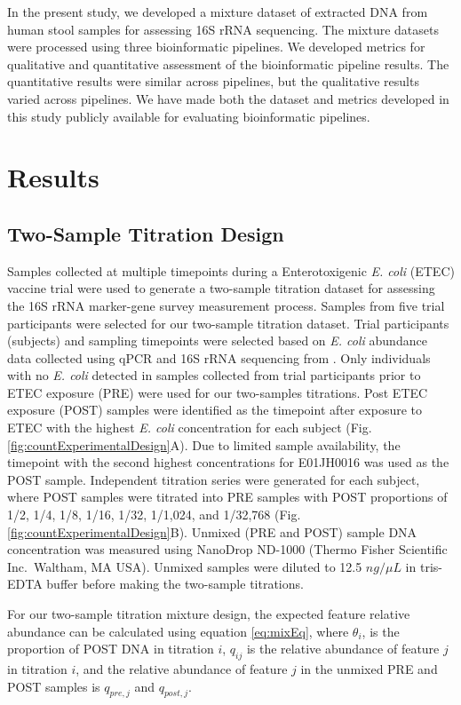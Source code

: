 \documentclass{bmcart}
\begin{document}
In the present study, we developed a mixture dataset of extracted DNA
from human stool samples for assessing 16S rRNA sequencing. The mixture
datasets were processed using three bioinformatic pipelines. We
developed metrics for qualitative and quantitative assessment of the
bioinformatic pipeline results. The quantitative results were similar
across pipelines, but the qualitative results varied across pipelines.
We have made both the dataset and metrics developed in this study
publicly available for evaluating bioinformatic pipelines.

\section*{Results}

\subsection*{Two-Sample Titration Design}

Samples collected at multiple timepoints during a Enterotoxigenic
\emph{E. coli} (ETEC) vaccine trial \cite{harro2011refinement} were
used to generate a two-sample titration dataset for assessing the 16S
rRNA marker-gene survey measurement process. Samples from five trial
participants were selected for our two-sample titration dataset. Trial
participants (subjects) and sampling timepoints were selected based on
\emph{E. coli} abundance data collected using qPCR and 16S rRNA
sequencing from \cite{pop2016individual}. Only individuals with no
\emph{E. coli} detected in samples collected from trial participants
prior to ETEC exposure (PRE) were used for our two-samples titrations.
Post ETEC exposure (POST) samples were identified as the timepoint after
exposure to ETEC with the highest \emph{E. coli} concentration for each
subject (Fig. \ref{fig:countExperimentalDesign}A). Due to limited sample
availability, the timepoint with the second highest concentrations for
E01JH0016 was used as the POST sample. Independent titration series were
generated for each subject, where POST samples were titrated into PRE
samples with POST proportions of 1/2, 1/4, 1/8, 1/16, 1/32, 1/1,024, and
1/32,768 (Fig. \ref{fig:countExperimentalDesign}B). Unmixed (PRE and
POST) sample DNA concentration was measured using NanoDrop ND-1000
(Thermo Fisher Scientific Inc.~Waltham, MA USA). Unmixed samples were
diluted to 12.5 \(ng/\mu L\) in tris-EDTA buffer before making the
two-sample titrations.

For our two-sample titration mixture design, the expected feature
relative abundance can be calculated using equation \eqref{eq:mixEq},
where \(\theta_i\), is the proportion of POST DNA in titration \(i\),
\(q_{ij}\) is the relative abundance of feature \(j\) in titration
\(i\), and the relative abundance of feature \(j\) in the unmixed PRE
and POST samples is \(q_{pre,j}\) and \(q_{post,j}\).
\end{document}
